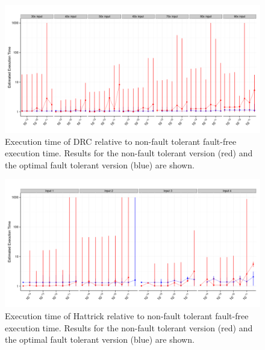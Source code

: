 \documentclass{sig-alternate}
\newcommand{\sui}[1]{%
  \textcolor{green}{SC - #1}
}
\begin{document}
\begin{figure}[ht!]
\centering
\includegraphics[width=2.00\columnwidth]{figs/DRC_EstdCost.png}
\vspace{-10pt}
\caption{Execution time of DRC relative to non-fault tolerant fault-free execution time. Results for the non-fault tolerant version (red) and the optimal fault tolerant version (blue) are shown.}
\vspace{-10pt}
\label{fig:DRC_EstdCost}
\end{figure}

\begin{figure}[ht!]
\centering
\includegraphics[width=2.00\columnwidth]{figs/Hattrick_EstdCost.png}
\vspace{-10pt}
\caption{Execution time of Hattrick relative to non-fault tolerant fault-free execution time. Results for the non-fault tolerant version (red) and the optimal fault tolerant version (blue) are shown.}
\vspace{-10pt}
\label{fig:Hattrick_EstdCost}
\end{figure}


\end{document}
